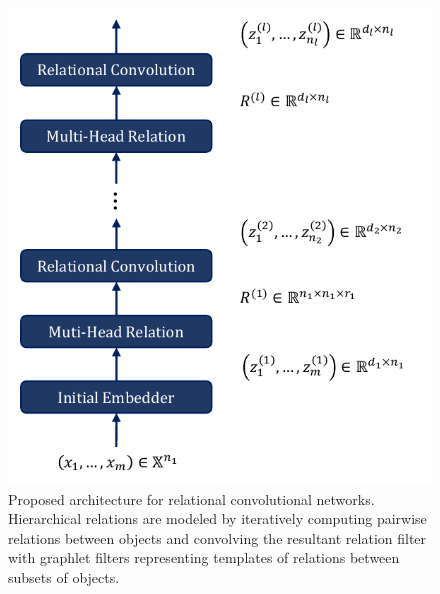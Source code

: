 \begin{figure}
    \centering
    \includegraphics[width=.5\textwidth]{figs/relconv_architecture.pdf}
    \caption{Proposed architecture for relational convolutional networks. Hierarchical relations are modeled by iteratively computing pairwise relations between objects and convolving the resultant relation filter with graphlet filters representing templates of relations between subsets of objects.}
    \label{fig:relconv_architecture}
\end{figure}

